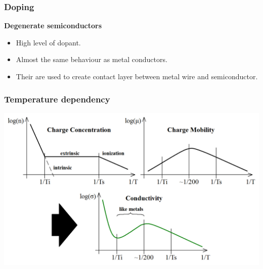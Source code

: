 \documentclass{beamer}
\begin{document}
	\begin{frame}
    \frametitle{Doping}
		\small
		
		\textbf{Degenerate semiconductors}
		
		\begin{itemize}
			\item High level of dopant.
			\item Almost the same behaviour as metal conductors.
			\item Their are used to create contact layer between metal wire and semiconductor.
		\end{itemize}
	\end{frame}
	\begin{frame}
    \frametitle{Temperature dependency}
		\begin{center}
			\includegraphics[scale=0.25]{obr02_tepZav.png}
		\end{center}
	\end{frame}
\end{document}
